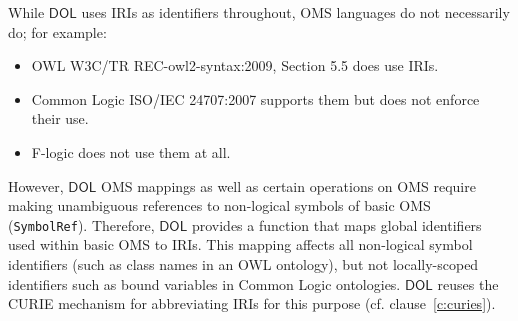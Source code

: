 \documentclass[10pt,fleqn,final]{scrreprt}
\makeatletter
\newcommand*{\cf}{cf.\@\xspace}
\newcommand*\CommentAuthor{}
\renewcommand*\CommentAuthor{#1}}
\newcommand*\CommentDate{}
\renewcommand*\CommentDate{#1}}
\newcommand*\CommentId{}
\renewcommand*\CommentId{#1}}
\newcommand*\CommentType{}
\renewcommand*\CommentType{#1}}
\newcommand*{\SetCommentColorByType}[1]{%
\edef\localType{{#1}}%
\expandafter\ifstrequal\localType{q-aut}{\colorlet{CommentColor}{red}}{%
\expandafter\ifstrequal\localType{q-all}{\colorlet{CommentColor}{orange}}{%
\expandafter\ifstrequal\localType{todo}{\colorlet{CommentColor}{orange}}{%
\expandafter\ifstrequal\localType{fyi}{\colorlet{CommentColor}{lightgray}}{%
\colorlet{CommentColor}{yellow}}}}}}
\newcommand*{\SetCommentPrefixByType}[1]{%
\edef\localType{{#1}}%
\expandafter\@ifmtarg\localType{%
\edef\CommentPrefix{}%
}{%
\caseupper[q]{#1}%
\edef\CommentPrefix{\thestring: }%
}}
\newcommand*{\initComment}[1]{%
\setkeys{Comment}{#1}%
\SetCommentColorByType{\CommentType}%
\relax%
\SetCommentPrefixByType{\CommentType}%
\relax%
}
\newcommand*{\todonote}[2][]{%
\initComment{#1}%
\pdfcomment[author=\CommentAuthor,color=CommentColor,date=\CommentDate,id=\CommentId]{%
\CommentPrefix
#2}}
\renewcommand*{\todonote}[2][]{%
\initComment{#1}%
\ednote{\CommentPrefix #2}}
\newcommand*{\CLnote}[2][author=Christoph Lange]{%
\todonote[author=Christoph Lange,#1]{#2} 
}
\newcommand*{\syntax}[1]{\texttt{#1}}
\newcommand*{\DOL}{\ensuremath{\mathsf{DOL}}\xspace}
\newcommand{\clauserefname}{clause}
\newcommand{\cref}[1]{\clauserefname~\ref{#1}}
\newcommand{\nisref}[1]{#1}
\newenvironment{definitions}[0]{\medskip }{}
\makeatother
\begin{document}
\begin{definitions}
While \DOL uses IRIs as identifiers throughout, OMS languages do not necessarily do; for example:
\begin{itemize}
\item OWL \nisref{W3C/TR REC-owl2-syntax:2009, Section 5.5} does use IRIs.
\item Common Logic \nisref{ISO/IEC 24707:2007} supports them but does not enforce their use.
\item F-logic \cite{flogic} does not use them at all.
\end{itemize}
However, \DOL OMS mappings as well as 
certain operations on OMS require making unambiguous references to non-logical symbols of basic OMS (\syntax{SymbolRef}).  Therefore, \DOL provides a function that maps global identifiers used within basic OMS to IRIs.  This mapping affects all non-logical symbol identifiers (such as class names in an OWL ontology), but not locally-scoped identifiers such as bound variables in Common Logic ontologies.  \DOL reuses the CURIE mechanism for abbreviating IRIs for this purpose (\cf \cref{c:curies}).


\end{definitions}
\end{document}
